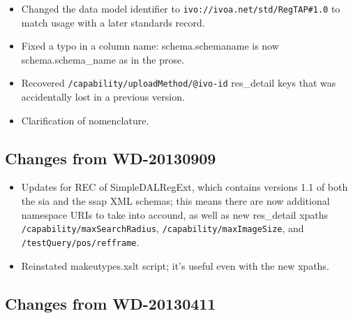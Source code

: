 \documentclass[11pt,a4paper]{ivoa}
\begin{document}
\label{changes-20131203}


\begin{itemize}

\item Changed the data model identifier to
  \texttt{ivo://ivoa.net/std/RegTAP\#1.0} to match usage with a
  later standards record.{}

\item Fixed a typo in a column name: schema.schemaname is now schema.schema\_name
  as in the prose.{}

\item Recovered 
  \texttt{/capability/uploadMethod/@ivo-id} res\_detail keys that was
  accidentally lost in a previous version.{}

\item Clarification of nomenclature.{}

\end{itemize}



\subsection{Changes from WD-20130909}

\label{changes-20130909}


\begin{itemize}

\item Updates for REC of SimpleDALRegExt, which contains versions 1.1 of
  both the sia and the ssap XML schemas; this means there are now additional
  namespace URIs to take into accound, as well as new res\_detail xpaths
  \texttt{/capability/maxSearchRadius}, 
  \texttt{/capability/maxImageSize}, and 
  \texttt{/testQuery/pos/refframe}.{}

\item Reinstated makeutypes.xslt script; it's useful even with the new
  xpaths.{}

\end{itemize}



\subsection{Changes from WD-20130411}
\end{document}
